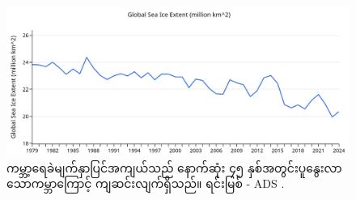 \documentclass[10pt,twocolumn,letterpaper]{article}
\begin{document}
\begin{figure}[t]
\begin{center}
\includegraphics[width=1\textwidth]{ice.jpg}
\end{center}
   \caption{ကမ္ဘာ့ရေခဲမျက်နှာပြင်အကျယ်သည် နောက်ဆုံး ၄၅ နှစ်အတွင်းပူနွေးလာသောကမ္ဘာကြောင့် ကျဆင်းလျက်ရှိသည်။ ရင်းမြစ် - ADS \cite{149}.}
\label{fig:24}
\end{figure}

\clearpage
\twocolumn

{\small
\renewcommand{\refname}{ကိုးကားချက်များ}


}
\end{document}
